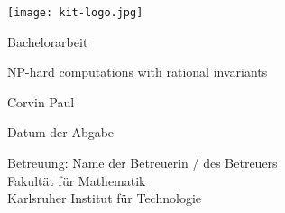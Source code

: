 \documentclass[12pt,a4paper]{scrartcl}
\numberwithin{equation}{section}
\begin{document}
  \pagestyle{empty}

  \begin{titlepage}

    \texttt{[image: kit-logo.jpg]} 
    \vspace*{2cm} 

 \begin{center} \large 
    
    Bachelorarbeit
    \vspace*{2cm}

    {\huge NP-hard computations with rational invariants}
    \vspace*{2.5cm}

    Corvin Paul
    \vspace*{1.5cm}

    Datum der Abgabe
    \vspace*{4.5cm}


    Betreuung: Name der Betreuerin / des Betreuers \\[1cm]
    Fakultät für Mathematik \\[1cm]
		Karlsruher Institut für Technologie
  \end{center}
\end{titlepage}



  \tableofcontents

\newpage
 


  \pagestyle{headings}


 \newpage  %

\newpage

\newpage

\newpage

\newpage

  \newpage
  
  
{}

 
      

\newpage
  
 \thispagestyle{empty}


\vspace*{8cm}
\end{document}
